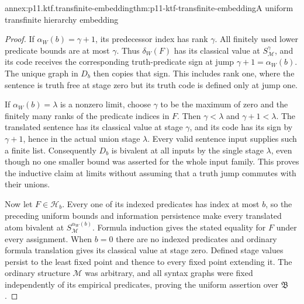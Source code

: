 \begin{annexitem}{annex:p11.ktf.transfinite-embedding}{thm:p11-ktf-transfinite-embedding}{A uniform transfinite hierarchy embedding}
\begin{proof}
If \(\alpha_W(b)=\gamma+1\), its predecessor index has
rank \(\gamma\). All finitely used lower predicate bounds
are at most \(\gamma\). Thus \(\delta_W(F)\) has its
classical value at \(S_{\mathcal M}^{\gamma}\), and its
code receives the corresponding truth-predicate sign at jump
\(\gamma+1=\alpha_W(b)\). The unique graph in \(D_b\)
then copies that sign. This includes rank one, where the sentence
is truth free at stage zero but its truth code is defined only
at jump one.

If \(\alpha_W(b)=\lambda\) is a nonzero limit, choose
\(\gamma\) to be the maximum of zero and the finitely
many ranks of the predicate indices in \(F\). Then
\(\gamma<\lambda\) and \(\gamma+1<\lambda\).
The translated sentence has its classical value at stage
\(\gamma\), and its code has its sign by
\(\gamma+1\), hence in the actual union stage \(\lambda\).
Every valid sentence input supplies such a finite list. Consequently
\(D_b\) is bivalent at all inputs by the single stage
\(\lambda\), even though no one smaller bound was asserted
for the whole input family. This proves the inductive claim at
limits without assuming that a truth jump commutes with their unions.

Now let \(F\in\mathcal H_b\). Every one of its indexed
predicates has index at most \(b\), so the preceding uniform
bounds and information persistence make every translated atom bivalent
at \(S_{\mathcal M}^{\alpha_W(b)}\). Formula induction
gives the stated equality for \(F\) under every assignment.
When \(b=0\) there are no indexed predicates and ordinary
formula translation gives its classical value at stage zero.
Defined stage values persist to the least fixed point and thence
to every fixed point extending it. The ordinary structure \(\mathcal M\)
was arbitrary, and all syntax graphs were fixed independently of
its empirical predicates, proving the uniform assertion over
\(\mathfrak B\).
\end{proof}
\end{annexitem}

